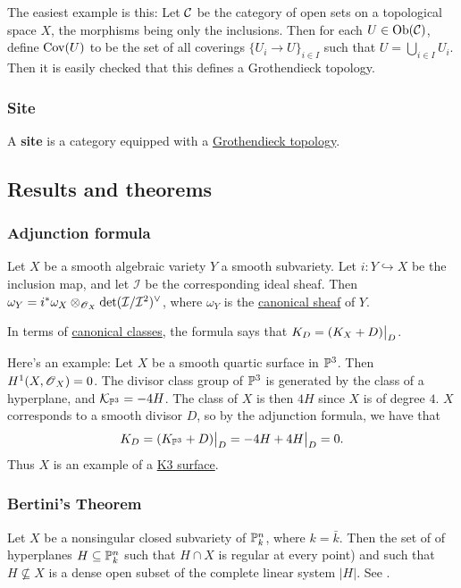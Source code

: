 \documentclass[11pt, english]{article}
\begin{document}
The easiest example is this: Let $\mathcal{C}$ be the category of open sets on a topological space $X$, the morphisms being only the inclusions. Then for each $U \in \mathrm{Ob}(\mathcal{C})$, define $\operatorname{Cov}(U)$ to be the set of all coverings $\{ U_i \to U \}_{i \in I}$ such that $U = \bigcup_{i\in I} U_i$. Then it is easily checked that this defines a Grothendieck topology.

\subsubsection{Site}
\label{site}

A \textbf{site} is a category equipped with a \hyperref[grothendiecktopology]{Grothendieck topology}.


\subsection{Results and theorems}
\subsubsection{Adjunction formula}
\label{adjunction}

Let $X$ be a smooth algebraic variety $Y$ a smooth subvariety. Let $i:Y \hookrightarrow X$ be the inclusion map, and let $\mathcal I$ be the corresponding ideal sheaf. Then $\omega_Y = i^\ast \omega_X \otimes_{\operatorname{\mathscr{O}}_X} \det(\mathcal I/\mathcal I^2)^\vee$, where $\omega_Y$ is the \hyperref[canonicalsheaf]{canonical sheaf} of $Y$.

In terms of \hyperref[canonicaldivisor]{canonical classes}, the formula says that $K_D = \restr{(K_X + D)}{D}$. 

Here's an example: Let $X$ be a smooth quartic surface in $\mathbb{P}^3$. Then $H^1(X,\operatorname{\mathscr{O}}_X)=0$. The divisor class group of $\mathbb{P}^3$ is generated by the class of a hyperplane, and $\mathcal K_{\mathbb{P}^3}=-4H$. The class of $X$ is then $4H$ since $X$ is of degree $4$. $X$ corresponds to a smooth divisor $D$, so by the adjunction formula, we have that
\[
K_D = \restr{(K_{\PP^3}+D)}{D} = \restr{-4H+4H}{D} = 0.
\]
Thus $X$ is an example of a \hyperref[k3]{K3 surface}. 


\subsubsection{Bertini's Theorem}
\label{bertini}
Let $X$ be a nonsingular closed subvariety of $\mathbb{P}_k^n$, where $k=\bar k$. Then the set of of hyperplanes $H \subseteq \mathbb{P}_k^n$ such that $H \cap X$ is regular at every point) and such that $H\not  \subseteq X$ is a dense open subset of the complete linear system $|H|$. See \cite[Thm II.8.18]{hartshorne}.
\end{document}
